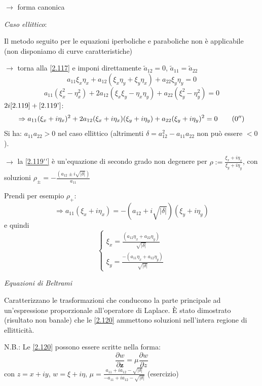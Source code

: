 \documentclass[a4paper,11pt]{report}
\newcommand{\z}{\boldsymbol{z}}
\begin{document}
$\rightarrow$ forma canonica

\medskip

\emph{Caso ellittico}:

Il metodo seguito per le equazioni iperboliche e paraboliche non \`e applicabile (non disponiamo di curve caratteristiche)

$\rightarrow$ torna alla \eqref{2.117} e imponi direttamente $\tilde{a}_{12}=0$, $\tilde{a}_{11}=\tilde{a}_{22}$
\begin{equation}
a_{11}\xi_x \eta_x + a_{12}(\xi_x\eta_y + \xi_y\eta_x) + a_{22}\xi_y\eta_y=0
\label{2.119}
\end{equation}
\begin{equation}
a_{11}(\xi_x^2 - \eta_x^2) + 2a_{12}(\xi_x\xi_y - \eta_x\eta_y) + a_{22}(\xi_y^2 - \eta_y^2)=0
\label{2.119'}
\tag{$\theequation^\prime$}
\end{equation}
$2i\eqref{2.119} + \eqref{2.119'}$:
\begin{equation}
\Rightarrow a_{11}(\xi_x + i\eta_x)^2 + 2a_{12}(\xi_x + i\eta_x)(\xi_y + i\eta_y) + a_{22}(\xi_y + i\eta_y)^2 =0
\label{2.119''}
\tag{$\theequation^{\prime\prime}$}
\end{equation}
Si ha: $a_{11}a_{22}>0$ nel caso ellittico (altrimenti $\delta =a_{12}^2 - a_{11}a_{22}$ non pu\`o essere $<0$). 

$\rightarrow$ la \eqref{2.119''} \`e un'equazione di secondo grado non degenere per $\rho:= \frac{\xi_x + i\eta_x}{\xi_y + i\eta_y}$, con soluzioni $\rho_{\pm}=-\frac{\left(a_{12} \pm i\sqrt{|\delta|} \right)} { a_{11}}$

Prendi per esempio $\rho_+$:
\[
\Rightarrow a_{11} (\xi_x + i\eta_x)=-(a_{12}+i\sqrt{|\delta|})(\xi_y + i \eta_y)
\]
e quindi 
\begin{equation}
\begin{cases}
\xi_x=\frac{(a_{12}\eta_x + a_{22}\eta_y)}{\sqrt{|\delta|}} \\
\xi_y=\frac{-(a_{11}\eta_x + a_{12}\eta_y)}{\sqrt{|\delta|}}
\end{cases}
\label{2.120}
\end{equation}
\centerline{\emph{Equazioni di Beltrami}} 

Caratterizzano le trasformazioni che conducono la parte principale ad un'espressione proporzionale all'operatore di Laplace. \`E stato dimostrato (risultato non banale) che le \eqref{2.120} ammettono soluzioni nell'intera regione di ellitticit\`a.

N.B.: Le \eqref{2.120} possono essere scritte nella forma:
\begin{equation}
\frac{\partial w}{\partial \z}=\mu\frac{\partial w}{\partial z}
\label{2.120'}
\tag{$\theequation^\prime$}
\end{equation}
con $z=x+iy$, $w=\xi+i\eta$, $\mu=\frac{a_{11}+i a_{12} - \sqrt{|\delta|}}{-a_{11}+i a_{12} - \sqrt{|\delta|}}$ (esercizio)
\end{document}
